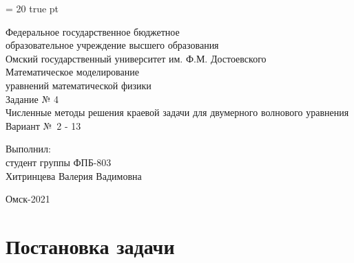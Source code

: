 \documentclass[a4paper,12pt]{article}
\begin{document}
	
	\graphicspath{{figures/}}
	
	\baselineskip = 20 true pt \vspace{40mm} \large
	\begin{titlepage}
		\begin{center}
			Федеральное государственное бюджетное\\ образовательное
			учреждение высшего образования\\[0.5cm]
			Омский государственный университет им. Ф.М. Достоевского\\[3cm]
			
			Математическое моделирование\\ уравнений математической физики\\[2cm]
			Задание № 4\\[1cm]
			Численные методы решения краевой задачи для двумерного волнового уравнения\\[3cm]
Вариант №\ 2 - 13\\[2cm]
\end{center}

\begin{flushright}
Выполнил:\\
студент группы ФПБ-803\\
Хитринцева Валерия Вадимовна\\[3cm]
\end{flushright}

\begin{center}
Омск-2021
\end{center}
\end{titlepage}

\setcounter{page}{2} 
\tableofcontents
\newpage

\newpage
\section{Постановка задачи}
\label{sec:normal}
\end{document}
